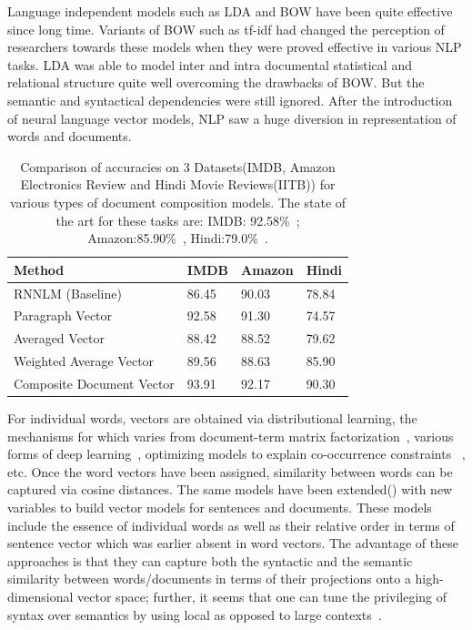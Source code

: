 \documentclass[11pt,a4paper]{article}
\begin{document}
Language independent models such as LDA  and BOW have been quite effective since long time. Variants of BOW such as tf-idf had changed the perception of researchers towards these models when they were proved effective in various NLP tasks. LDA was able to model inter and intra documental statistical and relational structure quite well overcoming the drawbacks of BOW. But the semantic and syntactical dependencies were still ignored. After the introduction of neural language vector models, NLP saw a huge diversion in representation of words and documents.
\begin{table}[h]
\centering
\small
\begin{tabular}{|p{3.7cm}|p{0.7cm}|p{0.95cm}|p{0.6cm}|}
\hline
\textbf{Method}                                                             & \textbf{IMDB}  & \textbf{Amazon} & \textbf{Hindi} \\ \hline
RNNLM (Baseline)                                               & 86.45          & 90.03           & 78.84          \\ \hline
Paragraph Vector \cite{Le:14}                                               & 92.58          & 91.30           & 74.57          \\ \hline
Averaged Vector                                                             & 88.42          & 88.52           & 79.62          \\ \hline
Weighted Average Vector                                                            & 89.56          & 88.63               & 85.90          \\ \hline
Composite Document Vector                                     & 93.91          & 92.17               & 90.30         \\ \hline
\end{tabular}
\caption {Comparison of accuracies on 3 Datasets(IMDB, Amazon Electronics Review and Hindi Movie Reviews(IITB)) for various types of document composition models. The state of the art for these tasks are: IMDB: 92.58\%~\cite{Le:14}; Amazon:85.90\%~\cite{Dredze:08}, Hindi:79.0\%~\cite{Bakliwal:12}.}
\label{table:3Datasets}
\end{table}
For individual words, vectors are obtained via distributional learning, the mechanisms for which varies from document-term matrix factorization~\cite{Landauer:97}, various forms of deep learning~\cite{Collobert:08,Turian:10,Socher:13}, optimizing models to explain co-occurrence constraints ~\cite{Mikolov:13a,Pennington:14}, etc. Once the word vectors have been assigned, similarity between words can be captured via cosine distances. The same models have been extended(\cite{Le:14}) with new variables to build vector models for sentences and documents. These models include the essence of individual words as well as their relative order in terms of sentence vector which was earlier absent in word vectors. The advantage of these approaches is that they can capture both the syntactic and the semantic similarity between words/documents in terms of their projections onto a high-dimensional vector space; further, it seems that one can tune the privileging of syntax over semantics by using local as opposed to large contexts~\cite{Huang:12}.
\end{document}
